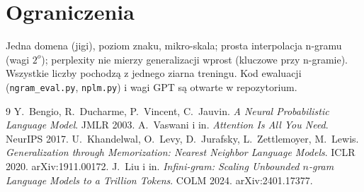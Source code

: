 \documentclass[11pt]{article}
\begin{document}
\section{Ograniczenia}
Jedna domena (jigi), poziom znaku, mikro-skala; prosta interpolacja n-gramu (wagi $2^o$); perplexity nie mierzy
generalizacji wprost (kluczowe przy n-gramie). Wszystkie liczby pochodzą z jednego ziarna treningu. Kod
ewaluacji (\texttt{ngram\_eval.py}, \texttt{nplm.py}) i wagi GPT są otwarte w repozytorium.

\begin{thebibliography}{9}
 Y.~Bengio, R.~Ducharme, P.~Vincent, C.~Jauvin. \emph{A Neural Probabilistic Language Model}. JMLR 2003.
 A.~Vaswani i in. \emph{Attention Is All You Need}. NeurIPS 2017.
 U.~Khandelwal, O.~Levy, D.~Jurafsky, L.~Zettlemoyer, M.~Lewis. \emph{Generalization through Memorization: Nearest Neighbor Language Models}. ICLR 2020. arXiv:1911.00172.
 J.~Liu i in. \emph{Infini-gram: Scaling Unbounded $n$-gram Language Models to a Trillion Tokens}. COLM 2024. arXiv:2401.17377.
\end{thebibliography}
\end{document}
